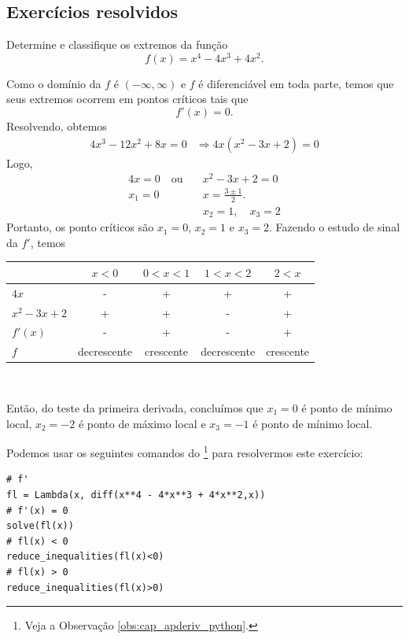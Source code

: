 \subsection*{Exercícios resolvidos}

\begin{exeresol}
  Determine e classifique os extremos da função
  \begin{equation}
    f(x) = x^4 - 4x^3 + 4x^2.
  \end{equation}
\end{exeresol}
\begin{resol}
  Como o domínio da $f$ é $(-\infty, \infty)$ e $f$ é diferenciável em toda parte, temos que seus extremos ocorrem em pontos críticos tais que
  \begin{equation}
    f'(x)=0.
  \end{equation}
  Resolvendo, obtemos
  \begin{align}
    4x^3-12x^2+8x=0 &\Rightarrow 4x(x^2-3x+2)=0
  \end{align}
  Logo,
  \begin{align}
    4x=0 \quad\text{ou}\quad &x^2-3x+2=0\\
    x_1 = 0                  &x = \frac{3\pm 1}{2}. \\
                             &x_2 = 1,\quad x_3=2
  \end{align}
  Portanto, os ponto críticos são $x_1=0$, $x_2=1$ e $x_3=2$. Fazendo o estudo de sinal da $f'$, temos
  \begin{center}
    \begin{tabular}{lcccc}\hline
                 & $x<0$ & $0<x<1$ & $1<x<2$ & $2<x$ \\\hline
      $4x$       & -       &     +       &     +      &   +  \\
      $x^2-3x+2$ & +       &     +       &     -      &   +   \\
      $f'(x)$    & -       &     +       &     -      &   +   \\
      $f$        & decrescente & crescente & decrescente & crescente \\\hline
    \end{tabular}\\
  \end{center}
  Então, do teste da primeira derivada, concluímos que $x_1=0$ é ponto de mínimo local, $x_2=-2$ é ponto de máximo local e $x_3=-1$ é ponto de mínimo local.

  \ifispython
  Podemos usar os seguintes comandos do \sympy\footnote{Veja a Observação \ref{obs:cap_apderiv_python}.} para resolvermos este exercício:
\begin{verbatim}
# f'
fl = Lambda(x, diff(x**4 - 4*x**3 + 4*x**2,x))
# f'(x) = 0
solve(fl(x))
# fl(x) < 0
reduce_inequalities(fl(x)<0)
# fl(x) > 0
reduce_inequalities(fl(x)>0)
\end{verbatim}
  \fi
\end{resol}

